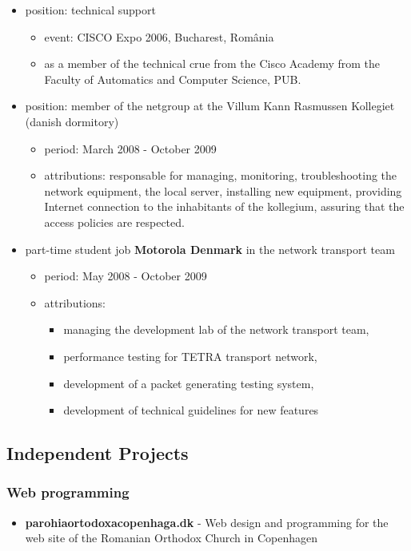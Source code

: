 \begin{itemize}
\begin{itemize}
			\end{itemize}
			\item position: technical support 
				\begin{itemize}
				 \item event: CISCO Expo 2006, Bucharest, România
                                 \item as a member of the technical crue from the Cisco Academy from the Faculty of Automatics and Computer Science, PUB.
                                \end{itemize}
			\item position: member of the netgroup at the Villum Kann Rasmussen Kollegiet (danish dormitory)
				\begin{itemize}
					\item period: March 2008 - October 2009 
					\item attributions: responsable for managing, monitoring, troubleshooting the network equipment, the local server, installing new equipment, providing Internet connection to the inhabitants of the kollegium, assuring that the access policies are respected.
				\end{itemize}
			\item part-time student job \textbf{Motorola Denmark} in the network transport team
				\begin{itemize}
					\item period: May 2008 - October 2009
					\item attributions: 
					\begin{itemize}
						\item managing the development lab of the network transport team, 
						\item performance testing for TETRA transport network, 
						\item development of a packet generating testing system, 
						\item development of technical guidelines for new features
					\end{itemize}
				\end{itemize}
		\end{itemize}	
	

	\subsection{Independent Projects}
		\subsubsection{Web programming}
		\begin{itemize}
			\item \textbf{parohiaortodoxacopenhaga.dk} - Web design and programming for the web site of the Romanian Orthodox Church in Copenhagen 
		\end{itemize}


